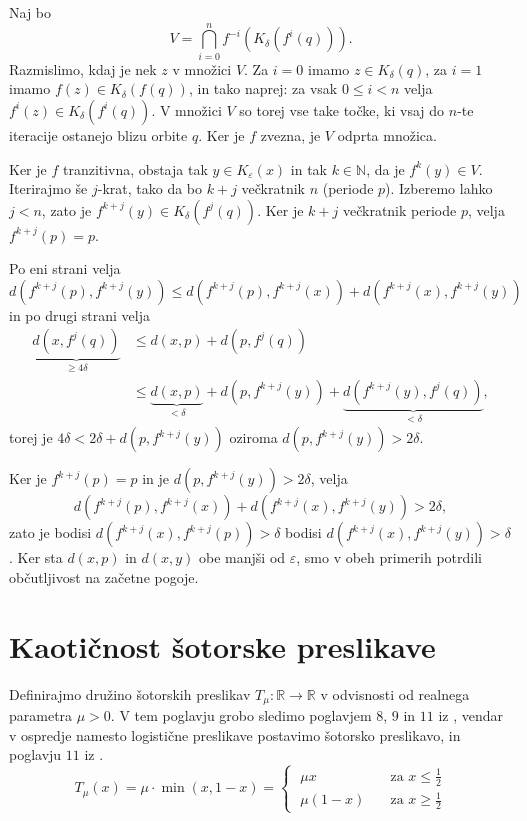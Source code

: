 \documentclass{isrmdelo}
\newcommand{\R}{\mathbb R}
\newcommand{\N}{\mathbb N}
\begin{document}
\begin{dokaz}
\bigskip

Naj bo $$ V = \bigcap_{i = 0}^{n} f^{-i}(K_\delta(f^i(q))) .$$ Razmislimo, kdaj je nek $z$ v množici $V$. Za $i=0$ imamo $z \in K_\delta(q)$, za $i=1$ imamo $f(z) \in K_\delta(f(q))$, in tako naprej: za vsak $0 \leq i < n$ velja $f^i(z) \in K_\delta(f^i(q))$. V množici $V$ so torej vse take točke, ki vsaj do $n$-te iteracije ostanejo blizu orbite $q$. Ker je $f$ zvezna, je $V$ odprta množica.

Ker je $f$ tranzitivna, obstaja tak $y \in K_\varepsilon(x)$ in tak $k \in \N$, da je $f^k(y) \in V$. Iterirajmo še $j$-krat, tako da bo $k+j$ večkratnik $n$ (periode $p$). Izberemo lahko $j < n$, zato je $f^{k+j}(y) \in K_\delta(f^j(q))$. Ker je $k+j$ večkratnik periode $p$, velja $f^{k+j}(p) = p$. 

Po eni strani velja
\begin{equation*}
d(f^{k+j}(p), f^{k+j}(y)) \leq d(f^{k+j}(p), f^{k+j}(x)) + d(f^{k+j}(x), f^{k+j}(y))
\end{equation*}
in po drugi strani velja
\begin{align*}
\underbrace{d(x, f^j(q))}_{\geq 4\delta} &\leq d(x, p) + d(p, f^j(q)) \\
&\leq \underbrace{d(x, p)}_{< \delta} + d(p, f^{k+j}(y)) + \underbrace{d(f^{k+j}(y), f^j(q))}_{< \delta},
\end{align*}
torej je $4\delta < 2\delta + d(p, f^{k+j}(y))$ oziroma $d(p, f^{k+j}(y)) > 2\delta$.

Ker je $f^{k+j}(p) = p$ in je $d(p, f^{k+j}(y)) > 2\delta$, velja $$d(f^{k+j}(p), f^{k+j}(x)) + d(f^{k+j}(x), f^{k+j}(y)) > 2\delta,$$ zato je bodisi $d(f^{k+j}(x), f^{k+j}(p)) > \delta$ bodisi $d(f^{k+j}(x), f^{k+j}(y)) > \delta$. Ker sta $d(x,p)$ in $d(x,y)$ obe manjši od $\varepsilon$, smo v obeh primerih potrdili občutljivost na začetne pogoje. \qedhere
\end{dokaz}

\clearemptydoublepage

\chapter{Kaotičnost šotorske preslikave}

Definirajmo družino šotorskih preslikav $T_{\mu}\colon \R \rightarrow \R$ v odvisnosti od realnega parametra $\mu > 0$. V tem poglavju grobo sledimo poglavjem $8$, $9$ in $11$ iz \cite{holmgren96}, vendar v ospredje namesto logistične preslikave postavimo šotorsko preslikavo, in poglavju $11$ iz \cite{teschl12}.
\begin{equation*}
T_\mu(x) = \mu \cdot \min(x, 1-x) =
\begin{cases}
    \;\mu x       &\quad \text{za } x \leq \frac{1}{2} \\
    \;\mu (1-x)   &\quad \text{za } x \geq \frac{1}{2}
\end{cases}
\end{equation*}
\end{document}
